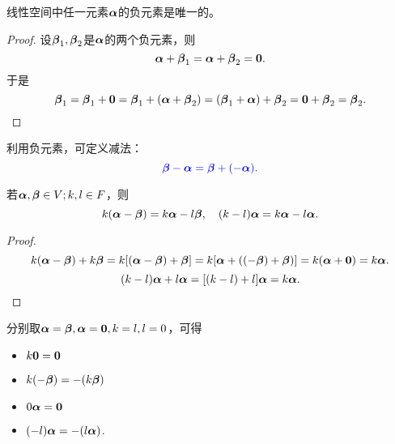 \begin{frame}
\begin{xingzhi}
  线性空间中任一元素$\boldsymbol{\alpha}$的负元素是唯一的。
\end{xingzhi} \pause 
\begin{proof}
  设$\boldsymbol{\beta}_1, \boldsymbol{\beta}_2$是$\boldsymbol{\alpha}$的两个负元素，则
  $$
  \alphabd + \betabd_1 = \alphabd + \betabd_2 = \M0.
  $$
  于是
  $$
  \betabd_1 = \betabd_1 + \M0 = \betabd_1 + (\alphabd + \betabd_2)
  = (\betabd_1 + \alphabd) + \betabd_2 = \M0 + \betabd_2 = \betabd_2.
  $$
\end{proof} \pause 

利用负元素，可定义减法：
$$
\textcolor{blue}{\boldsymbol{\beta} - \boldsymbol{\alpha} = \boldsymbol{\beta} + (-\boldsymbol{\alpha}).}
$$
\end{frame}

\begin{frame}
  \begin{xingzhi}
    若$\boldsymbol{\alpha}, \boldsymbol{\beta} \in V; k, l \in F$，则
    $$
    k(\boldsymbol{\alpha} - \boldsymbol{\beta}) = k \boldsymbol{\alpha} - l \boldsymbol{\beta}, \quad
    (k-l)\boldsymbol{\alpha} = k\boldsymbol{\alpha} - l \boldsymbol{\alpha}.
    $$
  \end{xingzhi}\pause 
  \begin{proof}
    $$
    k(\alphabd - \betabd) + k \betabd = k[(\alphabd - \betabd) + \betabd]
    = k[\alphabd + ((- \betabd) + \betabd)] = k(\alphabd + \M0) = k \alphabd.
    $$
    $$
    (k-l)\boldsymbol{\alpha} + l\boldsymbol{\alpha} = [(k-l)+l]\boldsymbol{\alpha} = k\boldsymbol{\alpha}.
    $$
  \end{proof}\pause 

  分别取$\alphabd=\betabd, \alphabd = \M0, k = l, l = 0$，可得
  \begin{xingzhi}
    \begin{itemize}
      \item $k\M0 = \M0$
      \item $k(-\boldsymbol{\beta}) = -(k\boldsymbol{\beta})$
      \item $0\alphabd = \M0$
      \item $(-l)\boldsymbol{\alpha} = -(l\boldsymbol{\alpha})$.
    \end{itemize}
  \end{xingzhi}
\end{frame}

